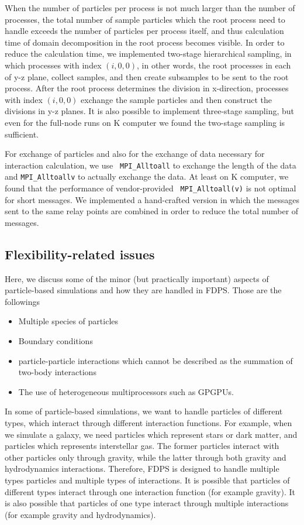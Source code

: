 \documentclass[dvipdfmx]{acm_proc_article-sp}
\begin{document}
When the number of particles per process is not much larger than the
number of processes, the total number of sample particles which the
root process need to handle exceeds the number of particles per
process itself, and thus calculation time of domain decomposition in the
root process becomes visible. In order to reduce the calculation time,
we implemented two-stage hierarchical sampling, in which processes
with index $(i,0,0)$, in other words, the root processes in each of y-z
plane, collect samples, and then create subsamples to be sent to the
root process. After the root process determines the division in
x-direction, 
processes with index $(i,0,0)$ exchange the sample particles and then
construct the divisions in y-z planes. It is also possible to
implement three-stage sampling,  but even for the full-node runs on K
computer we found the two-stage sampling is sufficient.

For exchange of particles and also for the exchange of data necessary
for interaction calculation, we use {\tt
    MPI\_Alltoall} to exchange the length of the data and
{\tt MPI\_Alltoallv} to actually
exchange the data. At least on K computer, we found that the
performance of vendor-provided {\tt
    MPI\_Alltoall(v)} is not optimal for short messages. We
implemented a hand-crafted version in which the messages sent to the
same relay points are combined in order to reduce the total number of
messages.

\subsection{Flexibility-related issues}

Here, we discuss some of the minor (but practically important)
aspects of particle-based simulations and how they are handled in
FDPS. Those are the followings
\begin{itemize}

  \item Multiple species of particles
  \item Boundary conditions
  \item particle-particle interactions which cannot be described as
    the summation of two-body interactions
  \item The use of heterogeneous multiprocessors such as GPGPUs.
\end{itemize}

In some of particle-based simulations, we want to handle particles of
different types, which interact through different interaction
functions. For example, when we simulate a galaxy, we need particles
which represent stars or dark matter, and particles which represents
interstellar gas. The former particles interact with other particles
only through gravity, while the latter through both gravity and
hydrodynamics interactions. Therefore, FDPS is designed to handle
multiple types particles and multiple types of interactions. It is
possible that particles of different types interact through one
interaction function (for example gravity). It is also possible that
particles of one type interact through multiple interactions (for
example gravity and hydrodynamics). 
\end{document}
